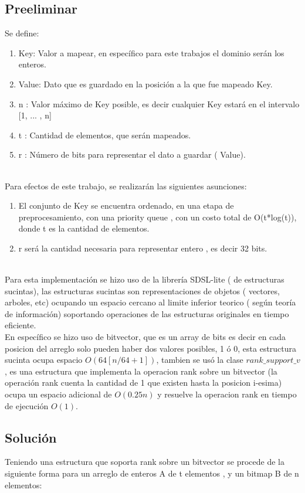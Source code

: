 \documentclass[11pt]{article}
\begin{document}
\subsection{Preeliminar}

Se define:
\begin{enumerate}
    \item Key: Valor a mapear, en específico para este trabajos el dominio serán los enteros.
    \item Value: Dato que es guardado en la posición a la que fue mapeado Key.
    \item n : Valor máximo de Key posible, es decir cualquier Key estará en el intervalo [1, ... , n]
    \item t : Cantidad de elementos, que serán mapeados.
    \item r : Número de bits para representar el dato a guardar ( Value).
\end{enumerate}
\\
Para efectos de este trabajo, se realizarán las siguientes asunciones:
\begin{enumerate}
    \item El conjunto de Key se encuentra ordenado, en una etapa de preprocesamiento, con una priority queue , con un costo total de O(t*log(t)), donde t es la cantidad de elementos.
    \item r será la cantidad necesaria para representar entero , es decir 32 bits.
\end{enumerate}
\\
Para esta implementación se hizo uso de la librería SDSL-lite ( de estructuras sucintas), las estructuras sucintas son representaciones de objetos ( vectores, arboles, etc) ocupando un espacio cercano al limite inferior teorico ( según teoría de información) soportando operaciones de las estructuras originales en tiempo eficiente. 
\\
En específico se hizo uso de bitvector, que es un array de bits es decir en cada posicion del arreglo solo pueden haber dos valores posibles, 1 ó 0, esta estructura sucinta ocupa espacio $O(64[n/64+1])$, tambien se usó la clase $rank\_support\_v$, es una estructura que implementa la operacion rank sobre un bitvector (la operación rank cuenta la cantidad de 1 que existen hasta la posicion i-esima) ocupa un espacio adicional de $O(0.25n)$ y resuelve la operacion rank en tiempo de ejecución $O(1)$.


\subsection{Solución}
Teniendo una estructura que soporta rank sobre un bitvector se procede de la siguiente forma para un arreglo de enteros A de t elementos , y un bitmap B de n elementos:
\end{document}
